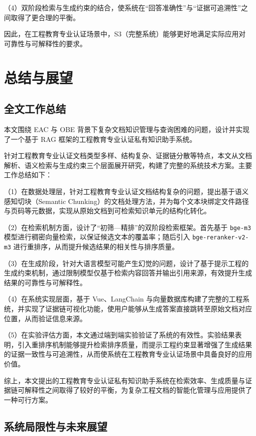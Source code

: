 \documentclass[UTF8,a4paper,zihao=-4]{ctexart}
\begin{document}
（4）双阶段检索与生成约束的结合，使系统在“回答准确性”与“证据可追溯性”之间取得了更合理的平衡。

因此，在工程教育专业认证场景中，S3（完整系统）能够更好地满足实际应用对可靠性与可解释性的要求。

\section{总结与展望}
\subsection{全文工作总结}

本文围绕 EAC 与 OBE 背景下复杂文档知识管理与查询困难的问题，设计并实现了一个基于 RAG 框架的工程教育专业认证私有知识助手系统。

针对工程教育专业认证文档类型多样、结构复杂、证据链分散等特点，本文从文档解析、语义检索与生成约束三个层面展开研究，构建了完整的系统技术方案。主要工作总结如下：

（1）在数据处理层，针对工程教育专业认证文档结构复杂的问题，提出基于语义感知切块（Semantic Chunking）的文档处理方法，并为每个文本块绑定文件路径与页码等元数据，实现从原始文档到可检索知识单元的结构化转化。

（2）在检索机制方面，设计了“初筛—精排”的双阶段检索框架。首先基于 \texttt{bge-m3} 模型进行稠密向量检索，以保证候选文本的覆盖率；随后引入 \texttt{bge-reranker-v2-m3} 进行重排序，从而提升候选结果的相关性与排序质量。

（3）在生成阶段，针对大语言模型可能产生幻觉的问题，设计了基于提示工程的生成约束机制，通过限制模型仅基于检索内容回答并输出引用来源，有效提升生成结果的可靠性与可解释性。

（4）在系统实现层面，基于 Vue、LangChain 与向量数据库构建了完整的工程系统，并实现了证据链可视化功能，使用户能够从生成答案直接跳转至原始文档对应位置，从而验证信息来源。

（5）在实验评估方面，本文通过端到端实验验证了系统的有效性。实验结果表明，引入重排序机制能够提升检索排序质量，而提示工程约束显著增强了生成结果的证据一致性与可追溯性，从而使系统在工程教育专业认证场景中具备良好的应用价值。

综上，本文提出的工程教育专业认证私有知识助手系统在检索效率、生成质量与证据链可解释性之间取得了较好的平衡，为复杂工程文档的智能化管理与应用提供了一种可行方案。

\subsection{系统局限性与未来展望}
\end{document}
